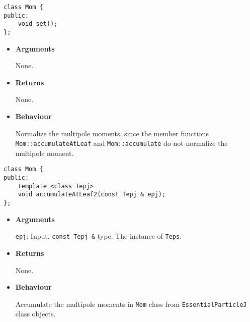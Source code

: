 
\begin{screen}
\begin{verbatim}
class Mom {
public:
    void set();
};
\end{verbatim}
\end{screen}

\begin{itemize}

\item {\bf Arguments}

  None.
  
\item {\bf Returns}

  None.

\item {\bf Behaviour}

  Normalize the multipole moments, since the member functions
  \texttt{Mom::accumulateAtLeaf} and \texttt{Mom::accumulate} do not
  normalize the multipole moment.

\end{itemize}


\begin{screen}
\begin{verbatim}
class Mom {
public:
    template <class Tepj>
    void accumulateAtLeaf2(const Tepj & epj);
};
\end{verbatim}
\end{screen}

\begin{itemize}

\item {\bf Arguments}

  \texttt{epj}: Input. \texttt{const Tepj \&} type. The instance of \texttt{Teps}.

\item {\bf Returns}

  None.

\item {\bf Behaviour}

  Accumulate the multipole moments in \texttt{Mom} class from \texttt{EssentialParticleJ} class objects.

\end{itemize}

